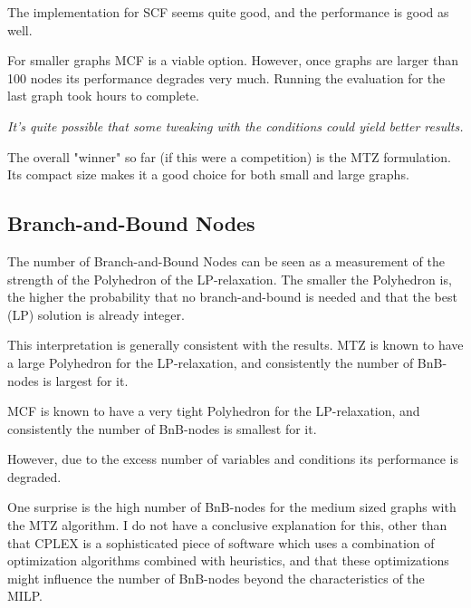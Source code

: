 \documentclass[11pt, oneside, a4paper, fleqn]{article}
\begin{document}
The implementation for SCF seems quite good, and the performance
is good as well.

For smaller graphs MCF is a viable option.
However, once graphs are larger than 100 nodes its performance
degrades very much.
Running the evaluation for the last graph took hours to complete.

\emph{It's quite possible that some tweaking with the conditions
could yield better results.}

The overall "winner" so far (if this were a competition) is the
MTZ formulation. Its compact size makes it a good choice for
both small and large graphs.

\subsection*{Branch-and-Bound Nodes}

The number of Branch-and-Bound Nodes can be seen as a measurement
of the strength of the Polyhedron of the LP-relaxation.
The smaller the Polyhedron is, the higher the probability that
no branch-and-bound is needed and that the best (LP) solution
is already integer.

This interpretation is generally consistent with the results.
MTZ is known to have a large Polyhedron for the LP-relaxation,
and consistently the number of BnB-nodes is largest for it.

MCF is known to have a very tight Polyhedron for the LP-relaxation,
and consistently the number of BnB-nodes is smallest for it.

However, due to the excess number of variables and conditions
its performance is degraded.

One surprise is the high number of BnB-nodes for the medium
sized graphs with the MTZ algorithm.
I do not have a conclusive explanation for this, other than
that CPLEX is a sophisticated piece of software which
uses a combination of optimization algorithms combined
with heuristics, and that these optimizations might influence the
number of BnB-nodes beyond the characteristics of the MILP.



\end{document}
